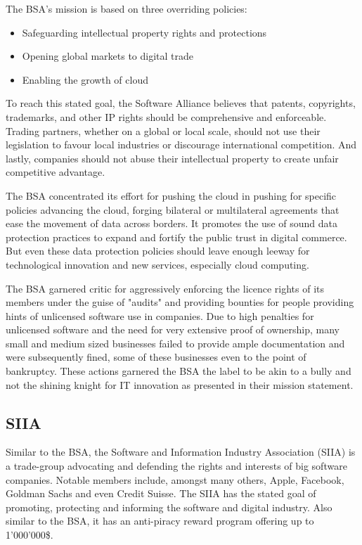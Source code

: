 \documentclass[a4paper]{report}
\begin{document}
\noindent The BSA's mission is based on three overriding policies:
\begin{itemize}
	\item Safeguarding intellectual property rights and protections
	\item Opening global markets to digital trade
	\item Enabling the growth of cloud 
\end{itemize}
\parencite{BSA2017}


To reach this stated goal, the Software Alliance believes that patents, copyrights, trademarks, and other IP rights should be comprehensive and enforceable. Trading partners, whether on a global or local scale, should not use their legislation to favour local industries or discourage international competition. And lastly, companies should not abuse their intellectual property to create unfair competitive advantage.

The BSA concentrated its effort for pushing the cloud in pushing for specific policies advancing the cloud, forging bilateral or multilateral agreements that ease the movement of data across borders. It promotes the use of sound data protection practices to expand and fortify the public trust in digital commerce. But even these data protection policies should leave enough leeway for technological innovation and new services, especially cloud computing.

The BSA garnered critic for aggressively enforcing the licence rights of its members under the guise of "audits" and providing bounties for people providing hints of unlicensed software use in companies. Due to high penalties for unlicensed software and the need for very extensive proof of ownership, many small and medium sized businesses failed to provide ample documentation and were subsequently fined, some of these businesses even to the point of bankruptcy. These actions garnered the BSA the label to be akin to a bully and not the shining knight for IT innovation as presented in their mission statement. \parencite{Gaskin2009}

\subsection{SIIA}
\label{ssec:SIIA}
Similar to the BSA, the Software and Information Industry Association (SIIA) is a trade-group advocating and defending the rights and interests of big software companies. Notable members include, amongst many others, Apple, Facebook, Goldman Sachs and even Credit Suisse. The SIIA has the stated goal of promoting, protecting and informing the software and digital industry. Also similar to the BSA, it has an anti-piracy reward program offering up to 1'000'000\$. \parencite{SIIAreward}
\end{document}
